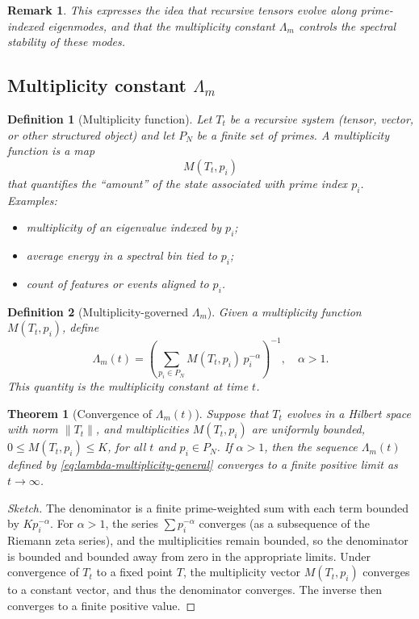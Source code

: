 \documentclass[11pt]{article}
\newtheorem{theorem}{Theorem}
\newtheorem{definition}{Definition}
\newtheorem{remark}{Remark}
\begin{document}
\begin{remark}
This expresses the idea that recursive tensors evolve along prime-indexed eigenmodes, and that the multiplicity constant $\Lambda_m$ controls the spectral stability of these modes.
\end{remark}

\subsection{Multiplicity constant $\Lambda_m$}

\begin{definition}[Multiplicity function]
Let $T_t$ be a recursive system (tensor, vector, or other structured object) and let $P_N$ be a finite set of primes. A \emph{multiplicity function} is a map
\[
M(T_t, p_i)
\]
that quantifies the ``amount'' of the state associated with prime index $p_i$. Examples:
\begin{itemize}[leftmargin=*]
  \item multiplicity of an eigenvalue indexed by $p_i$;
  \item average energy in a spectral bin tied to $p_i$;
  \item count of features or events aligned to $p_i$.
\end{itemize}
\end{definition}

\begin{definition}[Multiplicity-governed $\Lambda_m$]
Given a multiplicity function $M(T_t,p_i)$, define
\begin{equation}
  \Lambda_m(t)
  =
  \left(
    \sum_{p_i \in P_N}
    M(T_t, p_i) \, p_i^{-\alpha}
  \right)^{-1},
  \quad \alpha > 1.
  \label{eq:lambda-multiplicity-general}
\end{equation}
This quantity is the multiplicity constant at time $t$.
\end{definition}

\begin{theorem}[Convergence of $\Lambda_m(t)$]
Suppose that $T_t$ evolves in a Hilbert space with norm $\|T_t\|$, and multiplicities $M(T_t,p_i)$ are uniformly bounded, $0 \le M(T_t,p_i) \le K$, for all $t$ and $p_i \in P_N$. If $\alpha > 1$, then the sequence $\Lambda_m(t)$ defined by \eqref{eq:lambda-multiplicity-general} converges to a finite positive limit as $t \to \infty$.
\end{theorem}

\begin{proof}[Sketch]
The denominator is a finite prime-weighted sum with each term bounded by $K p_i^{-\alpha}$. For $\alpha>1$, the series $\sum p_i^{-\alpha}$ converges (as a subsequence of the Riemann zeta series), and the multiplicities remain bounded, so the denominator is bounded and bounded away from zero in the appropriate limits. Under convergence of $T_t$ to a fixed point $T$, the multiplicity vector $M(T_t,p_i)$ converges to a constant vector, and thus the denominator converges. The inverse then converges to a finite positive value.
\end{proof}
\end{document}
